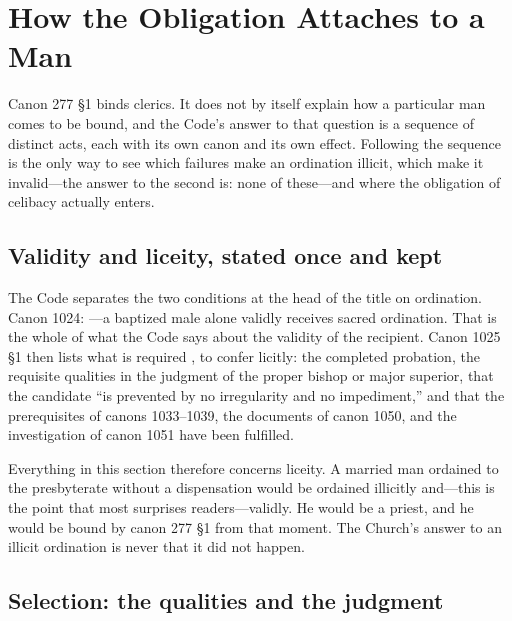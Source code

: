 \section{How the Obligation Attaches to a Man}

Canon 277 §1 binds clerics. It does not by itself explain how a particular man comes to be bound, and the Code's answer to that question is a sequence of distinct acts, each with its own canon and its own effect. Following the sequence is the only way to see which failures make an ordination illicit, which make it invalid---the answer to the second is: none of these---and where the obligation of celibacy actually enters.

\subsection{Validity and liceity, stated once and kept}

The Code separates the two conditions at the head of the title on ordination. Canon 1024: ---a baptized male alone validly receives sacred ordination. That is the whole of what the Code says about the validity of the recipient. Canon 1025 §1 then lists what is required , to confer licitly: the completed probation, the requisite qualities in the judgment of the proper bishop or major superior, that the candidate ``is prevented by no irregularity and no impediment,'' and that the prerequisites of canons 1033--1039, the documents of canon 1050, and the investigation of canon 1051 have been fulfilled.

Everything in this section therefore concerns liceity. A married man ordained to the presbyterate without a dispensation would be ordained illicitly and---this is the point that most surprises readers---validly. He would be a priest, and he would be bound by canon 277 §1 from that moment. The Church's answer to an illicit ordination is never that it did not happen.

\subsection{Selection: the qualities and the judgment}

